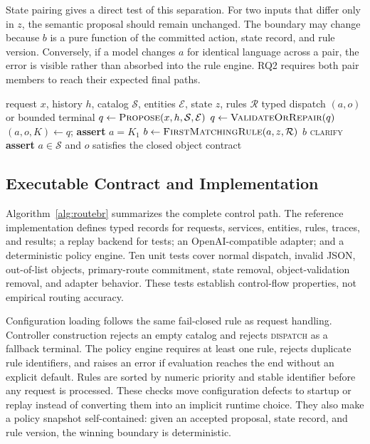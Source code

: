 \documentclass[10pt,conference,a4paper]{IEEEtran}
\begin{document}
State pairing gives a direct test of this separation. For two inputs that differ only in $z$, the semantic proposal should remain unchanged. The boundary may change because $b$ is a pure function of the committed action, state record, and rule version. Conversely, if a model changes $a$ for identical language across a pair, the error is visible rather than absorbed into the rule engine. RQ2 requires both pair members to reach their expected final paths.

\begin{algorithm}[!t]
\caption{Route before response}
\label{alg:routebr}
\footnotesize
\begin{algorithmic}[1]
\Require request $x$, history $h$, catalog $\mathcal{S}$, entities $\mathcal{E}$, state $z$, rules $\mathcal{R}$
\Ensure typed dispatch $(a,o)$ or bounded terminal
\State $q\gets\Call{Propose}{x,h,\mathcal{S},\mathcal{E}}$
\State $q\gets\Call{ValidateOrRepair}{q}$
 \State \Return {} \EndIf
\State $(a,o,K)\gets q$; \textbf{assert} $a=K_1$
\State $b\gets\Call{FirstMatchingRule}{a,z,\mathcal{R}}$
 \State \Return $b$ \EndIf
{} \State \Return \textsc{clarify} \EndIf
\State \textbf{assert} $a\in\mathcal{S}$ and $o$ satisfies the closed object contract
\State \Return {}
\end{algorithmic}
\end{algorithm}

\subsection{Executable Contract and Implementation}

Algorithm~\ref{alg:routebr} summarizes the complete control path. The reference implementation defines typed records for requests, services, entities, rules, traces, and results; a replay backend for tests; an OpenAI-compatible adapter; and a deterministic policy engine. Ten unit tests cover normal dispatch, invalid JSON, out-of-list objects, primary-route commitment, state removal, object-validation removal, and adapter behavior. These tests establish control-flow properties, not empirical routing accuracy.

Configuration loading follows the same fail-closed rule as request handling. Controller construction rejects an empty catalog and rejects \textsc{dispatch} as a fallback terminal. The policy engine requires at least one rule, rejects duplicate rule identifiers, and raises an error if evaluation reaches the end without an explicit default. Rules are sorted by numeric priority and stable identifier before any request is processed. These checks move configuration defects to startup or replay instead of converting them into an implicit runtime choice. They also make a policy snapshot self-contained: given an accepted proposal, state record, and rule version, the winning boundary is deterministic.
\end{document}
